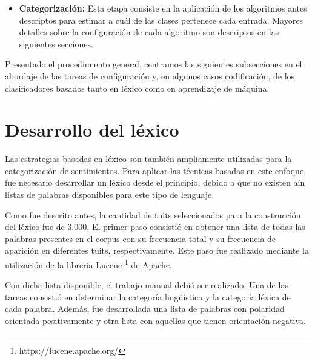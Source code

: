 \begin{itemize}
\begin{enumerate}
\item Algunos bigramas considerados neutrales son eliminados, pues consideramos que no representan impacto alguno referente a polaridad en las opiniones, incluso en las neutrales. Estas son las expresiones de saludos tales como ``buenos d\'ias'' y otras similares; son utilizadas de manera respetuosa precediendo a alguna pregunta, comentario, sugerencia o incluso una queja.
\end{enumerate} 
\item \textbf{Categorizaci\'on:} Esta etapa consiste en la aplicaci\'on de los algoritmos antes descriptos para estimar a cu\'al de las clases pertenece cada entrada. Mayores detalles sobre la configuraci\'on de cada algoritmo son descriptos en las siguientes secciones.
\end{itemize}

Presentado el procedimiento general, centramos las siguientes subsecciones en el abordaje de las tareas de configuraci\'on y, en algunos casos codificaci\'on, de los clasificadores basados tanto en l\'exico como en aprendizaje de m\'aquina.

\section{Desarrollo del l\'exico}

Las estrategias basadas en l\'exico son tambi\'en ampliamente utilizadas para la categorizaci\'on de sentimientos. Para aplicar las t\'ecnicas basadas en este enfoque, fue necesario desarrollar un l\'exico desde el principio, debido a que no existen a\'in listas de palabras disponibles para este tipo de lenguaje.
\newline 

Como fue descrito antes, la cantidad de tuits seleccionados para la construcci\'on del l\'exico fue de 3.000. El primer paso consisti\'o en obtener una lista de todas las palabras presentes en el corpus con su frecuencia total y su frecuencia de aparici\'on en diferentes tuits, respectivamente. Este paso fue realizado mediante la utilizaci\'on de la librer\'ia Lucene \footnote{https://lucene.apache.org/} de Apache.
\newline 

Con dicha lista disponible, el trabajo manual debi\'o ser realizado. Una de las tareas consisti\'o en determinar la categor\'ia ling\"u\'istica y la categor\'ia l\'exica de cada palabra. Adem\'as, fue desarrollada una lista de palabras con polaridad orientada positivamente y otra lista con aquellas que tienen orientaci\'on negativa.

